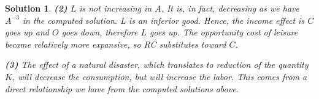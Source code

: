 \documentclass{article} %
\theoremstyle{quest}
\newtheorem*{solution}{Solution}
\begin{document}
\begin{solution}
\smallskip

\textbf{(2)}
$L$ is not increasing in $A$. It is, in fact, decreasing as we have $A^{-3}$ in the computed solution.
L is an inferior good. Hence, the income effect is $C$ goes up and $O$ goes down, therefore $L$ goes up.
The opportunity cost of leisure became relatively more expansive, so RC substitutes toward $C$.
\smallskip

\textbf{(3)}
The effect of a natural disaster, which translates to reduction of the quantity $K$, will decrease
the consumption, but will increase the labor. This comes from a direct relationship 
we have from the computed solutions above.
\end{solution}
\end{document}
